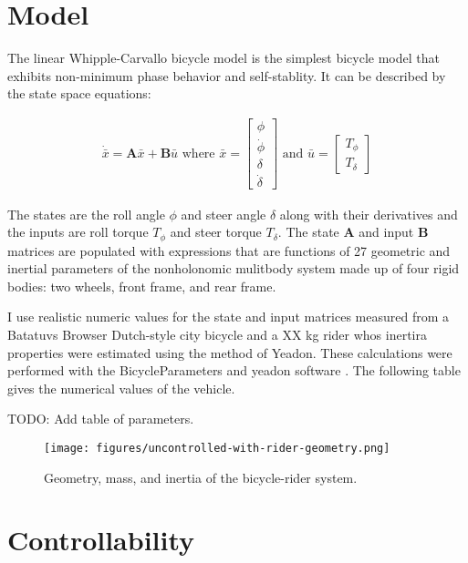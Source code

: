 \documentclass[12pt]{article}
\begin{document}
\section{Model}

The linear Whipple-Carvallo bicycle model
\cite{Whipple1899a,Carvallo1899,Meijaard2007} is the simplest bicycle model
that exhibits non-minimum phase behavior and self-stablity. It can be described
by the state space equations:

\begin{align}
  \dot{\bar{x}} = \mathbf{A} \bar{x} + \mathbf{B} \bar{u}
  \textrm{ where }
  \bar{x} = \begin{bmatrix} \phi \\ \dot{\phi} \\ \delta \\ \dot{\delta} \end{bmatrix}
  \textrm{ and }
  \bar{u} = \begin{bmatrix} T_{\phi} \\ T_{\delta} \end{bmatrix}
\end{align}

The states are the roll angle \(\phi\) and steer angle \(\delta\) along with
their derivatives and the inputs are roll torque \(T_\phi\) and steer torque
\(T_\delta\). The state \(\mathbf{A}\) and input \(\mathbf{B}\) matrices are
populated with expressions that are functions of 27 geometric and inertial
parameters of the nonholonomic mulitbody system made up of four rigid bodies:
two wheels, front frame, and rear frame.

I use realistic numeric values for the state and input matrices measured from a
Batatuvs Browser Dutch-style city bicycle and a XX kg rider whos inertira
properties were estimated using the method of Yeadon. These calculations were
performed with the BicycleParameters and yeadon software \cite{Dembia2015}. The
following table gives the numerical values of the vehicle.

TODO: Add table of parameters.

\begin{figure}
  \centering
  \texttt{[image: figures/uncontrolled-with-rider-geometry.png]}
  \caption{Geometry, mass, and inertia of the bicycle-rider system.}
  \label{fig:uncontrolled-with-rider-geometry}
\end{figure}

\section{Controllability}
\end{document}
